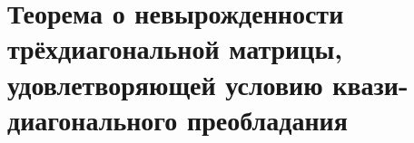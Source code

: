 \documentclass[__main__.tex]{subfiles}
\begin{document}
\section{Теорема о невырожденности трёхдиагональной матрицы, удовлетворяющей условию квази-диагонального преобладания}
\end{document}
